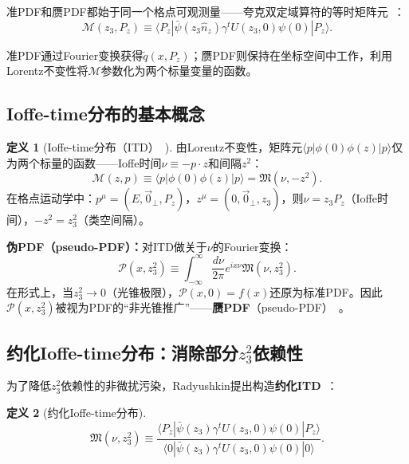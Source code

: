 \documentclass[12pt,a4paper]{ctexart}
\theoremstyle{definition}
\newtheorem{definition}{定义}[section]
\begin{document}
准PDF和赝PDF都始于同一个格点可观测量——夸克双定域算符的等时矩阵元~\cite{Radyushkin2018oneLoop}：
\begin{equation}
\mathcal{M}(z_3, P_z) \equiv \langle P_z | \bar\psi(z_3\hat n_z) \gamma^t U(z_3, 0) \psi(0) | P_z \rangle.
\label{eq:common_ME}
\end{equation}

准PDF通过Fourier变换获得$\tilde q(x, P_z)$；赝PDF则保持在坐标空间中工作，利用Lorentz不变性将$\mathcal{M}$参数化为两个标量变量的函数。

\subsection{Ioffe-time分布的基本概念}

\begin{definition}[Ioffe-time分布（ITD）~\cite{Radyushkin2018oneLoop}]
由Lorentz不变性，矩阵元$\langle p | \phi(0) \phi(z) | p \rangle$仅为两个标量的函数——Ioffe时间$\nu \equiv -p\cdot z$和间隔$z^2$：
\begin{equation}
\mathcal{M}(z, p) \equiv \langle p | \phi(0) \phi(z) | p \rangle = \mathfrak{M}(\nu, -z^2).
\label{eq:ITD_general}
\end{equation}
在格点运动学中：$p^\mu = (E, \vec 0_\perp, P_z)$，$z^\mu = (0, \vec 0_\perp, z_3)$，则$\nu = z_3 P_z$（Ioffe时间），$-z^2 = z_3^2$（类空间隔）。
\end{definition}

\textbf{伪PDF（pseudo-PDF）：}对ITD做关于$\nu$的Fourier变换：
\begin{equation}
\mathcal{P}(x, z_3^2) \equiv \int_{-\infty}^\infty \frac{d\nu}{2\pi} e^{i x \nu} \mathfrak{M}(\nu, z_3^2).
\label{eq:pseudo_PDF_def}
\end{equation}
在形式上，当$z_3^2 \to 0$（光锥极限），$\mathcal{P}(x, 0) = f(x)$还原为标准PDF。因此$\mathcal{P}(x, z_3^2)$被视为PDF的``非光锥推广''——\textbf{赝PDF}（pseudo-PDF）~\cite{Radyushkin2018oneLoop}。

\subsection{约化Ioffe-time分布：消除部分$z_3^2$依赖性}

为了降低$z_3^2$依赖性的非微扰污染，Radyushkin提出构造\textbf{约化ITD}~\cite{Radyushkin2018oneLoop}：
\begin{definition}[约化Ioffe-time分布]
\begin{equation}
\boxed{\mathfrak{M}(\nu, z_3^2) \equiv \frac{\langle P_z | \bar\psi(z_3)\gamma^t U(z_3,0)\psi(0) | P_z \rangle}{\langle 0 | \bar\psi(z_3)\gamma^t U(z_3,0)\psi(0) | 0 \rangle}}.
\label{eq:reduced_ITD}
\end{equation}
\end{definition}
\end{document}
